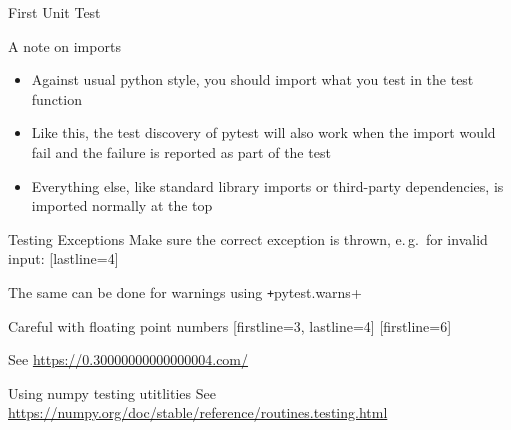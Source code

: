\begin{frame}[c, fragile]{First Unit Test}

\end{frame}

\begin{frame}[c]{A note on imports}

  \begin{itemize}
    \item Against usual python style, you should import what you test in the test function
    \item Like this, the test discovery of pytest will also work when the import would fail and the failure is reported as part of the test
    \item Everything else, like standard library imports or third-party dependencies, is imported normally at the top
  \end{itemize}
\end{frame}

\begin{frame}[c]{Testing Exceptions}
  Make sure the correct exception is thrown, e.\,g.\ for invalid input:
  [lastline=4]

  The same can be done for warnings using \texttt+pytest.warns+
\end{frame}


\begin{frame}[c, fragile]{Careful with floating point numbers}
  [firstline=3, lastline=4]
  [firstline=6]

  See \url{https://0.30000000000000004.com/}
\end{frame}

\begin{frame}[c, fragile]{Using numpy testing utitlities}
  See \url{https://numpy.org/doc/stable/reference/routines.testing.html}
\end{frame}

